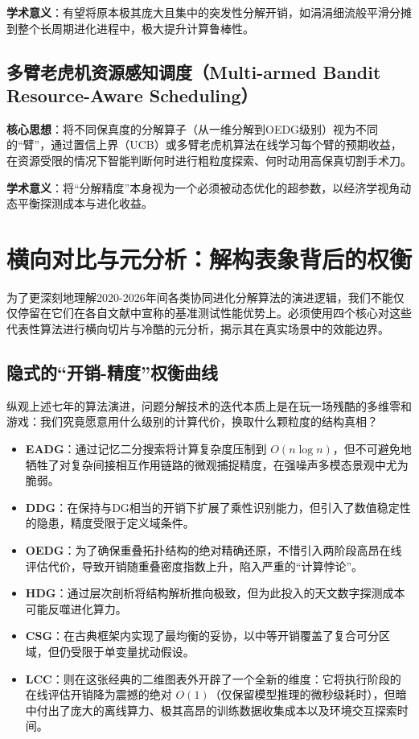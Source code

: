 \textbf{学术意义}：有望将原本极其庞大且集中的突发性分解开销，如涓涓细流般平滑分摊到整个长周期进化进程中，极大提升计算鲁棒性。

\subsection{多臂老虎机资源感知调度（Multi-armed Bandit Resource-Aware Scheduling）}
\textbf{核心思想}：将不同保真度的分解算子（从一维分解到OEDG级别）视为不同的“臂”，通过置信上界（UCB）或多臂老虎机算法在线学习每个臂的预期收益，在资源受限的情况下智能判断何时进行粗粒度探索、何时动用高保真切割手术刀。

\textbf{学术意义}：将“分解精度”本身视为一个必须被动态优化的超参数，以经济学视角动态平衡探测成本与进化收益。

\section{横向对比与元分析：解构表象背后的权衡}
为了更深刻地理解2020-2026年间各类协同进化分解算法的演进逻辑，我们不能仅仅停留在它们在各自文献中宣称的基准测试性能优势上。必须使用四个核心对这些代表性算法进行横向切片与冷酷的元分析，揭示其在真实场景中的效能边界。

\subsection{隐式的“开销-精度”权衡曲线}
纵观上述七年的算法演进，问题分解技术的迭代本质上是在玩一场残酷的多维零和游戏：我们究竟愿意用什么级别的计算代价，换取什么颗粒度的结构真相？

\begin{itemize}
    \item \textbf{EADG}：通过记忆二分搜索将计算复杂度压制到 $O(n \log n)$，但不可避免地牺牲了对复杂间接相互作用链路的微观捕捉精度，在强噪声多模态景观中尤为脆弱。
    \item \textbf{DDG}：在保持与DG相当的开销下扩展了乘性识别能力，但引入了数值稳定性的隐患，精度受限于定义域条件。
    \item \textbf{OEDG}：为了确保重叠拓扑结构的绝对精确还原，不惜引入两阶段高昂在线评估代价，导致开销随重叠密度指数上升，陷入严重的“计算悖论”。
    \item \textbf{HDG}：通过层次剖析将结构解析推向极致，但为此投入的天文数字探测成本可能反噬进化算力。
    \item \textbf{CSG}：在古典框架内实现了最均衡的妥协，以中等开销覆盖了复合可分区域，但仍受限于单变量扰动假设。
    \item \textbf{LCC}：则在这张经典的二维图表外开辟了一个全新的维度：它将执行阶段的在线评估开销降为震撼的绝对 $O(1)$（仅保留模型推理的微秒级耗时），但暗中付出了庞大的离线算力、极其高昂的训练数据收集成本以及环境交互探索时间。
\end{itemize}

